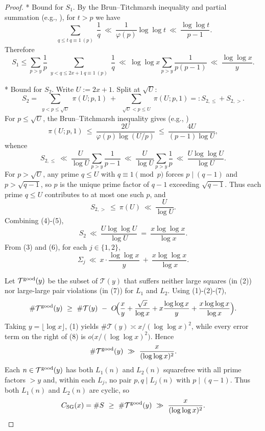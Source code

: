 \documentclass[12pt]{article}
\renewcommand{\tag}[1]{}
\theoremstyle{remark}
\begin{document}
\begin{proof}
* Bound for $S_1$. By the Brun--Titchmarsh inequality and partial summation (e.g., \cite{MV2007,IK2004}), for $t>p$ we have
$$\sum_{\substack{q\le t\ q\equiv1\ (p)}}\frac{1}{q}\ \ll\ \frac{1}{\varphi(p)}\log\log t\ \ll\ \frac{\log\log t}{p-1}.$$
Therefore
$$S_1\le \sum_{p>y}\frac{1}{p}\sum_{\substack{y<q\le 2x+1\ q\equiv1\ (p)}}\frac{1}{q}\ \ll\ \log\log x\sum_{p>y}\frac{1}{p(p-1)}\ \ll\ \frac{\log\log x}{y}.\tag{3}$$

* Bound for $S_2$. Write $U:=2x+1$. Split at $\sqrt U$:
\[S_2=\sum_{\substack{y<p\le\sqrt U}}\pi(U;p,1)\ +\ \sum_{\substack{\sqrt U<p\le U}}\pi(U;p,1)=:S_{2,\le}+S_{2,>}.
\]
For $p\le\sqrt U$, the Brun--Titchmarsh inequality gives (e.g., \cite{MV2007,IK2004})
$$\pi(U;p,1)\ \le\ \frac{2U}{\varphi(p)\log(U/p)}\ \le\ \frac{4U}{(p-1)\log U},$$
whence
$$S_{2,\le}\ \ll\ \frac{U}{\log U}\sum_{p>y}\frac{1}{p-1}\ \ll\ \frac{U}{\log U}\sum_{p>y}\frac{1}{p}\ \ll\ \frac{U\log\log U}{\log U}.\tag{4}$$
For $p>\sqrt U$, any prime $q\le U$ with $q\equiv1\pmod p$ forces $p\mid(q-1)$ and $p>\sqrt{q-1}$, so $p$ is the unique prime factor of $q-1$ exceeding $\sqrt{q-1}$. Thus each prime $q\le U$ contributes to at most one such $p$, and
$$S_{2,>}\ \le\ \pi(U)\ \ll\ \frac{U}{\log U}.\tag{5}$$
Combining (4)-(5),
$$S_2\ \ll\ \frac{U\log\log U}{\log U}\ =\ \frac{x\log\log x}{\log x}.\tag{6}$$
From (3) and (6), for each $j\in\{1,2\}$,
$$\Sigma_j\ \ll\ x\cdot\frac{\log\log x}{y}\ +\ \frac{x\log\log x}{\log x}.\tag{7}$$

Let $\mathcal T^{\rm good}(y)$ be the subset of $\mathcal T(y)$ that suffers neither large squares (in (2)) nor large-large pair violations (in (7)) for $L_1$ and $L_2$. Using (1)-(2)-(7),
\[\#\mathcal T^{\rm good}(y)\ \ge\ \#\mathcal T(y)\ -\ O\!\Bigl(\frac{x}{y}+\frac{\sqrt{x}}{\log x}+x\frac{\log\log x}{y}+\frac{x\log\log x}{\log x}\Bigr).\tag{8}\]
Taking $y=\lfloor\log x\rfloor$, (1) yields $\#\mathcal T(y)\asymp x/(\log\log x)^2$, while every error term on the right of (8) is $o\bigl(x/(\log\log x)^2\bigr)$. Hence
$$\#\mathcal T^{\rm good}(y)\ \gg\ \frac{x}{(\log\log x)^2}.\tag{9}$$
Each $n\in\mathcal T^{\rm good}(y)$ has both $L_1(n)$ and $L_2(n)$ squarefree with all prime factors $>y$ and, within each $L_j$, no pair $p,q\mid L_j(n)$ with $p\mid(q-1)$. Thus both $L_1(n)$ and $L_2(n)$ are cyclic, so
$$C_{\mathrm{SG}}(x)=\#S\ \ge\ \#\mathcal T^{\rm good}(y)\ \gg\ \frac{x}{(\log\log x)^2}.\tag{10}$$


\end{proof}
\end{document}
